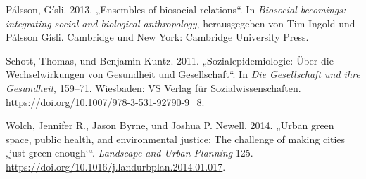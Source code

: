 \documentclass[
  ngerman,
]{article}
\newlength{\cslhangindent}
\newlength{\cslentryspacingunit} %
\newenvironment{CSLReferences}[2] %
 {%
  \setlength{\parindent}{0pt}
  \ifodd #1
  \let\oldpar\par
  \def\par{\hangindent=\cslhangindent\oldpar}
  \fi
  \setlength{\parskip}{#2\cslentryspacingunit}
 }%
 {}
\begin{document}
\begin{CSLReferences}{1}{0}
\leavevmode{}%
Pálsson, Gísli. 2013. {„Ensembles of biosocial relations``}. In \emph{Biosocial becomings: integrating social and biological anthropology}, herausgegeben von Tim Ingold und Pálsson Gísli. Cambridge und New York: {Cambridge University Press}.

\leavevmode{}%
Schott, Thomas, und Benjamin Kuntz. 2011. {„Sozialepidemiologie: {Ü}ber die Wechselwirkungen von Gesundheit und Gesellschaft``}. In \emph{Die Gesellschaft und ihre Gesundheit}, 159--71. Wiesbaden: {VS} Verlag f{ü}r Sozialwissenschaften. \url{https://doi.org/10.1007/978-3-531-92790-9_8}.

\leavevmode{}%
Wolch, Jennifer R., Jason Byrne, und Joshua P. Newell. 2014. {„Urban green space, public health, and environmental justice: The challenge of making cities {‚just green enough`}``}. \emph{Landscape and Urban Planning} 125. \url{https://doi.org/10.1016/j.landurbplan.2014.01.017}.

\end{CSLReferences}
\end{document}
